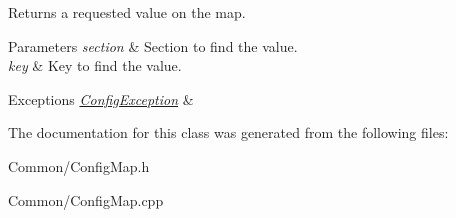 Returns a requested value on the map. 


\begin{DoxyParams}{Parameters}
{\em section} & Section to find the value. \\
\hline
{\em key} & Key to find the value.\\
\hline
\end{DoxyParams}

\begin{DoxyExceptions}{Exceptions}
{\em \hyperlink{class_common_1_1_config_exception}{Config\-Exception}} & \\
\hline
\end{DoxyExceptions}


The documentation for this class was generated from the following files\-:\begin{DoxyCompactItemize}
\item 
Common/Config\-Map.\-h\item 
Common/Config\-Map.\-cpp\end{DoxyCompactItemize}
